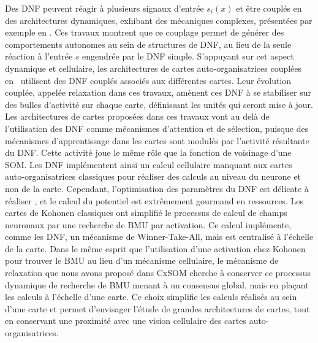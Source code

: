 \documentclass[../main]{subfiles}
\begin{document}
Des DNF peuvent réagir à plusieurs signaux d'entrée $s_i(x)$ et être couplés en des architectures dynamiques, exhibant des mécaniques complexes, présentées par exemple en \cite{Fix2011ADN, Sandamirskaya2014DynamicNF}.
Ces travaux montrent que ce couplage permet de générer des comportements autonomes au sein de structures de DNF, au lieu de la seule réaction à l'entrée $s$ engendrée par le DNF simple.
S'appuyant sur cet aspect dynamique et cellulaire, les architectures de cartes auto-organisatrices couplées en~\cite{khouzam_neural_2014,menard05} utilisent des DNF couplés associés aux différentes cartes. Leur évolution couplée, appelée relaxation dans ces travaux, amènent ces DNF à se stabiliser sur des bulles d'activité sur chaque carte, définissant les unités qui seront mise à jour.
Les architectures de cartes proposées dans ces travaux vont au delà de l'utilisation des DNF comme mécanismes d'attention et de sélection, puisque des mécanismes d'apprentissage dans les cartes sont modulés par l'activité résultante du DNF. Cette activité joue le même rôle que la fonction de voisinage d'une SOM.
Les DNF implémentent ainsi un calcul cellulaire manquant aux cartes auto-organisatrices classiques pour réaliser des calculs au niveau du neurone et non de la carte.
Cependant, l'optimisation des paramètres du DNF est délicate à réaliser \cite{fix:hal-00869726}, et le calcul du potentiel est extrêmement gourmand en ressources.
Les cartes de Kohonen classiques ont simplifié le processus de calcul de champs neuronaux par une recherche de BMU par activation. Ce calcul implémente, comme les DNF, un mécanisme de Winner-Take-All, mais est centralisé à l'échelle de la carte.
Dans le même esprit que l'utilisation d'une activation chez Kohonen pour trouver le BMU au lieu d'un mécanisme cellulaire, le mécanisme de relaxation que nous avons proposé dans CxSOM cherche à conserver ce processus dynamique de recherche de BMU menant à un consensus global, mais en plaçant les calculs à l'échelle d'une carte. 
Ce choix simplifie les calculs réalisés au sein d'une carte et permet d'envisager l'étude de grandes architectures de cartes, tout en conservant une proximité avec une vision cellulaire des cartes auto-organisatrices.
\end{document}
